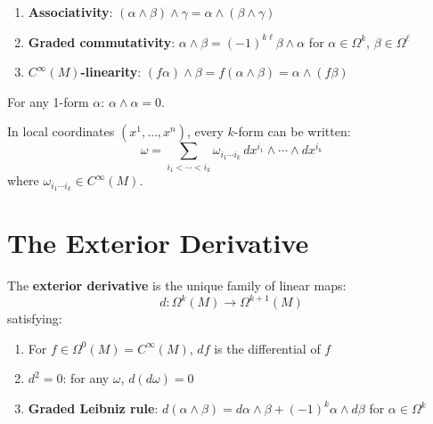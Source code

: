 \begin{proposition}
    \begin{enumerate}
        \item \textbf{Associativity}: $(\alpha \wedge \beta) \wedge \gamma = \alpha \wedge (\beta \wedge \gamma)$
        \item \textbf{Graded commutativity}: $\alpha \wedge \beta = (-1)^{k\ell} \beta \wedge \alpha$ for $\alpha \in \Omega^k$, $\beta \in \Omega^\ell$
        \item \textbf{$C^\infty(M)$-linearity}: $(f\alpha) \wedge \beta = f(\alpha \wedge \beta) = \alpha \wedge (f\beta)$
    \end{enumerate}
\end{proposition}

\begin{corollary}
    For any 1-form $\alpha$: $\alpha \wedge \alpha = 0$.
\end{corollary}

\begin{proposition}
    In local coordinates $(x^1, \ldots, x^n)$, every $k$-form can be written:
    \[
        \omega = \sum_{i_1 < \cdots < i_k} \omega_{i_1 \cdots i_k} \, dx^{i_1} \wedge \cdots \wedge dx^{i_k}
    \]
    where $\omega_{i_1 \cdots i_k} \in C^\infty(M)$.
\end{proposition}

\section{The Exterior Derivative}

\begin{definition}
    The \textbf{exterior derivative} is the unique family of linear maps:
    \[
        d: \Omega^k(M) \to \Omega^{k+1}(M)
    \]
    satisfying:
    \begin{enumerate}
        \item For $f \in \Omega^0(M) = C^\infty(M)$, $df$ is the differential of $f$
        \item $d^2 = 0$: for any $\omega$, $d(d\omega) = 0$
        \item \textbf{Graded Leibniz rule}: $d(\alpha \wedge \beta) = d\alpha \wedge \beta + (-1)^k \alpha \wedge d\beta$ for $\alpha \in \Omega^k$
    \end{enumerate}
\end{definition}


